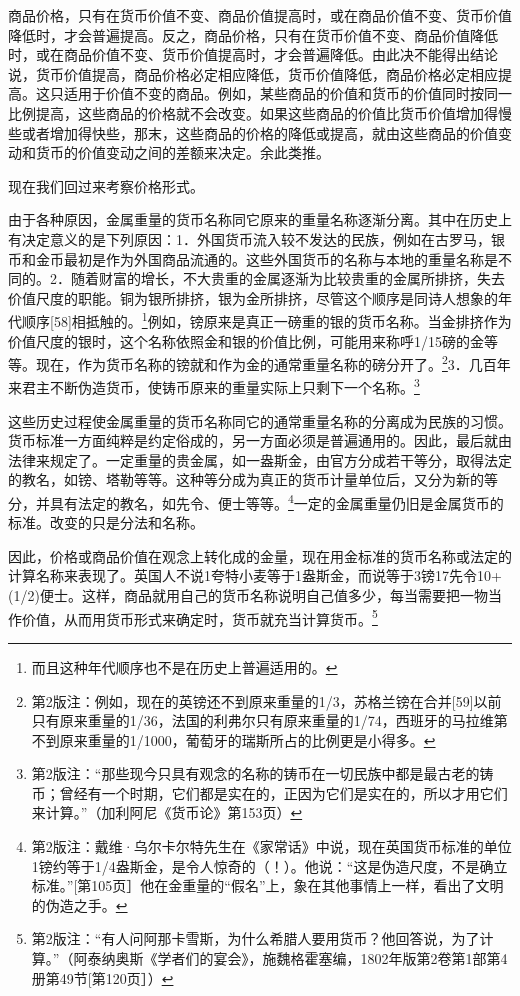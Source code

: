 \documentclass{ctexbook}
\begin{document}
    商品价格，只有在货币价值不变、商品价值提高时，或在商品价值不变、货币价值降低时，才会普遍提高。反之，商品价格，只有在货币价值不变、商品价值降低时，或在商品价值不变、货币价值提高时，才会普遍降低。由此决不能得出结论说，货币价值提高，商品价格必定相应降低，货币价值降低，商品价格必定相应提高。这只适用于价值不变的商品。例如，某些商品的价值和货币的价值同时按同一比例提高，这些商品的价格就不会改变。如果这些商品的价值比货币价值增加得慢些或者增加得快些，那末，这些商品的价格的降低或提高，就由这些商品的价值变动和货币的价值变动之间的差额来决定。余此类推。

    现在我们回过来考察价格形式。

    由于各种原因，金属重量的货币名称同它原来的重量名称逐渐分离。其中在历史上有决定意义的是下列原因：1．外国货币流入较不发达的民族，例如在古罗马，银币和金币最初是作为外国商品流通的。这些外国货币的名称与本地的重量名称是不同的。2．随着财富的增长，不大贵重的金属逐渐为比较贵重的金属所排挤，失去价值尺度的职能。铜为银所排挤，银为金所排挤，尽管这个顺序是同诗人想象的年代顺序[58]相抵触的。\footnote{而且这种年代顺序也不是在历史上普遍适用的。}例如，镑原来是真正一磅重的银的货币名称。当金排挤作为价值尺度的银时，这个名称依照金和银的价值比例，可能用来称呼1/15磅的金等等。现在，作为货币名称的镑就和作为金的通常重量名称的磅分开了。\footnote{第2版注：例如，现在的英镑还不到原来重量的1/3，苏格兰镑在合并[59]以前只有原来重量的1/36，法国的利弗尔只有原来重量的1/74，西班牙的马拉维第不到原来重量的1/1000，葡萄牙的瑞斯所占的比例更是小得多。}3．几百年来君主不断伪造货币，使铸币原来的重量实际上只剩下一个名称。\footnote{第2版注：“那些现今只具有观念的名称的铸币在一切民族中都是最古老的铸币；曾经有一个时期，它们都是实在的，正因为它们是实在的，所以才用它们来计算。”（加利阿尼《货币论》第153页）}

    这些历史过程使金属重量的货币名称同它的通常重量名称的分离成为民族的习惯。货币标准一方面纯粹是约定俗成的，另一方面必须是普遍通用的。因此，最后就由法律来规定了。一定重量的贵金属，如一盎斯金，由官方分成若干等分，取得法定的教名，如镑、塔勒等等。这种等分成为真正的货币计量单位后，又分为新的等分，并具有法定的教名，如先令、便士等等。\footnote{第2版注：戴维·乌尔卡尔特先生在《家常话》中说，现在英国货币标准的单位1镑约等于1/4盎斯金，是令人惊奇的（！）。他说：“这是伪造尺度，不是确立标准。”[第105页］他在金重量的“假名”上，象在其他事情上一样，看出了文明的伪造之手。}一定的金属重量仍旧是金属货币的标准。改变的只是分法和名称。

    因此，价格或商品价值在观念上转化成的金量，现在用金标准的货币名称或法定的计算名称来表现了。英国人不说1夸特小麦等于1盎斯金，而说等于3镑17先令10+(1/2)便士。这样，商品就用自己的货币名称说明自己值多少，每当需要把一物当作价值，从而用货币形式来确定时，货币就充当计算货币。\footnote{第2版注：“有人问阿那卡雪斯，为什么希腊人要用货币？他回答说，为了计算。”（阿泰纳奥斯《学者们的宴会》，施魏格霍塞编，1802年版第2卷第1部第4册第49节[第120页］）}
\end{document}

